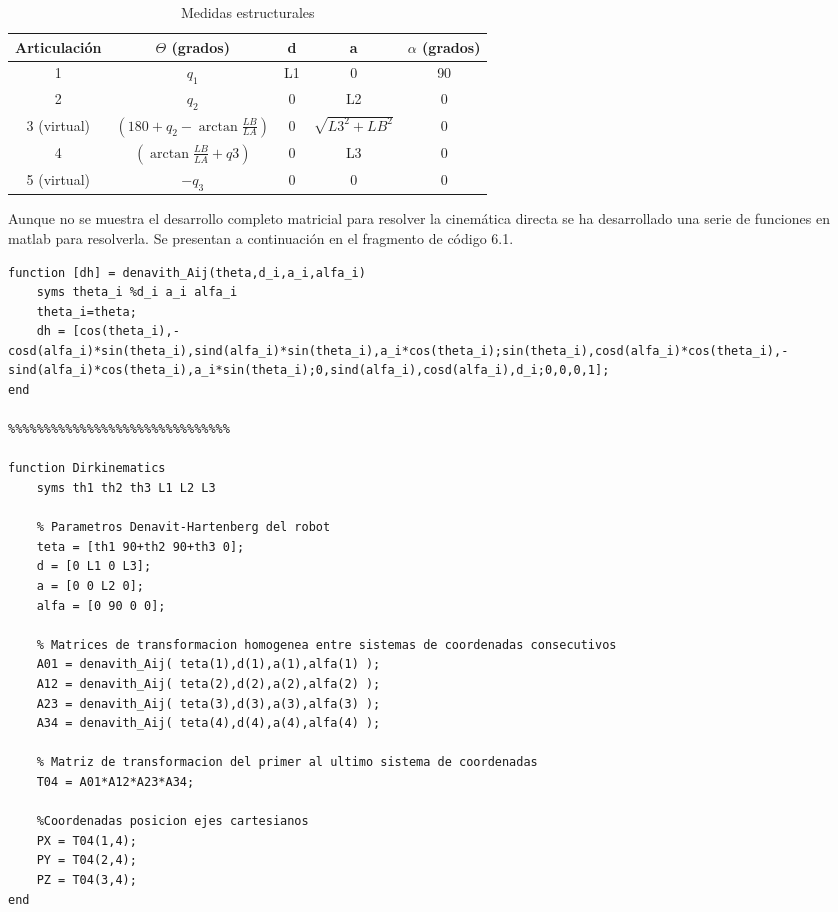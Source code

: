 	 \begin{table}[H]
	 	\caption{Medidas estructurales}
	 	\label{tab:dh}
	 	\begin{center}
	 		\begin{tabular}{ |c|c|c|c|c| }
	 			\hline
	 			Articulación & $\Theta$ (grados) & d & a & $\alpha$ (grados)\\
	 			\hline
	 			1 & $q_1$ & L1 & 0 & 90 \\
	 			\hline
	 			2 & $q_2$ & 0 & L2 & 0 \\
	 			\hline
	 			3 (virtual) & $\left(180+q_2-\arctan{\frac{LB}{LA}}\right)$ & 0 & $\sqrt{{L3}^2+{LB}^2}$ & 0 \\
	 			\hline
	 			4 & $\left(\arctan{\frac{LB}{LA}}+q3\right)$ & 0 & L3 & 0 \\
	 			\hline
	 			5 (virtual) & $-q_3$ & 0 & 0 & 0 \\
	 			\hline
	 		\end{tabular}
	 	\end{center}
	 \end{table}
	 
	 Aunque no se muestra el desarrollo completo matricial para resolver la cinemática directa se ha desarrollado una serie de funciones en matlab para resolverla. Se presentan a continuación en el fragmento de código 6.1.
	 
	 \lstset{language=matlab, breaklines=true, basicstyle=\footnotesize}
	     \begin{lstlisting}[frame=single, caption=Cálculos con DH en matlab, label=code:dhmatlab]
function [dh] = denavith_Aij(theta,d_i,a_i,alfa_i)
	syms theta_i %d_i a_i alfa_i	
	theta_i=theta;	
	dh = [cos(theta_i),-cosd(alfa_i)*sin(theta_i),sind(alfa_i)*sin(theta_i),a_i*cos(theta_i);sin(theta_i),cosd(alfa_i)*cos(theta_i),-sind(alfa_i)*cos(theta_i),a_i*sin(theta_i);0,sind(alfa_i),cosd(alfa_i),d_i;0,0,0,1];	
end

%%%%%%%%%%%%%%%%%%%%%%%%%%%%%%%

function Dirkinematics	
	syms th1 th2 th3 L1 L2 L3	
	
	% Parametros Denavit-Hartenberg del robot	
	teta = [th1 90+th2 90+th3 0];	
	d = [0 L1 0 L3];	
	a = [0 0 L2 0];	
	alfa = [0 90 0 0];	
	
	% Matrices de transformacion homogenea entre sistemas de coordenadas consecutivos	
	A01 = denavith_Aij( teta(1),d(1),a(1),alfa(1) );	
	A12 = denavith_Aij( teta(2),d(2),a(2),alfa(2) );	
	A23 = denavith_Aij( teta(3),d(3),a(3),alfa(3) );	
	A34 = denavith_Aij( teta(4),d(4),a(4),alfa(4) );	
	
	% Matriz de transformacion del primer al ultimo sistema de coordenadas	
	T04 = A01*A12*A23*A34;
		
	%Coordenadas posicion ejes cartesianos	
	PX = T04(1,4);	
	PY = T04(2,4);	
	PZ = T04(3,4);	
end
	     \end{lstlisting}
	
